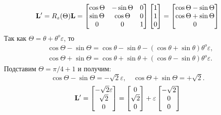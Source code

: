 \begin{frame}
\begin{columns}
\begin{column}{0.6\textwidth}
      \begin{equation*}
        \vb{L}^\prime = R_z(\Theta) \vb{L} = 
        \begin{bmatrix}
          \cos\Theta & -\sin\Theta & 0\\
          \sin\Theta & \cos\Theta & 0\\
          0 & 0 & 1
        \end{bmatrix}
        \begin{bmatrix}
          1\\1\\0
        \end{bmatrix}
        =
        \begin{bmatrix}
          \cos\Theta - \sin\Theta\\
          \cos\Theta + \sin\Theta\\
          0
        \end{bmatrix}
      \end{equation*}
      Так как $\Theta = \theta + \theta^o \varepsilon$, то
      \begin{align*}
        & \cos\Theta - \sin\Theta = \cos\theta - \sin\theta - (\cos\theta + \sin\theta)\theta^o\varepsilon,\\
        & \cos\Theta + \sin\Theta = \cos\theta +\sin\theta + (\cos\theta - \sin\theta)\theta^o\varepsilon.
      \end{align*}
      Подставим $\Theta = \pi/4 + 1$ и получим:
      \begin{equation*}
        \cos\Theta - \sin\Theta = -\sqrt{2}\varepsilon,
        \quad
        \cos\Theta + \sin\Theta = +\sqrt{2}.
      \end{equation*}
      \begin{equation*}
        \vb{L}^{\prime} =
        \begin{bmatrix}
          -\sqrt{2}\varepsilon\\
          \sqrt{2}\\
          0  
        \end{bmatrix}
        =
        \begin{bmatrix}
          0\\ \sqrt{2} \\ 0
        \end{bmatrix}
        +
        \varepsilon
        \begin{bmatrix}
          -\sqrt{2}\\
          0\\
          0
        \end{bmatrix}
      \end{equation*}
    \end{column}
  \end{columns}
\end{frame}

